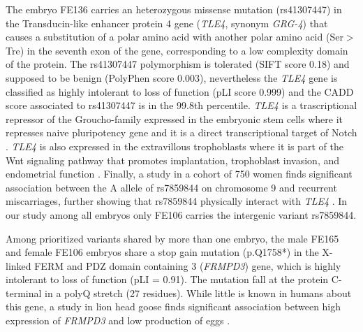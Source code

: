 The embryo FE136 carries an heterozygous missense mutation (rs41307447) in the Transducin-like enhancer protein 4 gene (\textit{TLE4}, synonym \textit{GRG-4}) that causes a substitution of a polar amino acid with another polar amino acid (Ser$>$Tre) in the seventh exon of the gene, corresponding to a low complexity domain of the protein. The rs41307447 polymorphism is tolerated (SIFT score 0.18) and supposed to be benign (PolyPhen score 0.003), nevertheless the \textit{TLE4} gene is classified as highly intolerant to loss of function (pLI score 0.999) and the CADD score associated to rs41307447 is in the 99.8th percentile. 
\textit{TLE4} is a trascriptional repressor of the Groucho-family expressed in the embryonic stem cells where it represses naive pluripotency gene \cite{laing2015gro} and it is a direct transcriptional target of Notch \cite{menchero2019transitions}. \textit{TLE4} is also expressed in the extravillous trophoblasts \cite{meinhardt2014wnt} where it is part of the Wnt signaling pathway that promotes implantation, trophoblast invasion, and endometrial function \cite{sonderegger2010wnt}. Finally, a study in a cohort of 750 women finds significant association between the A allele of rs7859844 on chromosome 9 and recurrent miscarriages, further showing that rs7859844 physically interact with \textit{TLE4} \cite{laisk2020genetic}. In our study among all embryos only FE106 carries the intergenic variant rs7859844. 

Among prioritized variants shared by more than one embryo, the male FE165 and female FE106 embryos share a stop gain mutation (p.Q1758*) in the X-linked FERM and PDZ domain containing 3 (\textit{FRMPD3}) gene, which is highly intolerant to loss of function (pLI = 0.91). The mutation fall at the protein C-terminal in a polyQ stretch (27 residues). While little is known in humans about this gene, a study in lion head goose finds significant association between high expression of \textit{FRMPD3} and low production of eggs \cite{zhao2020genome}. 

